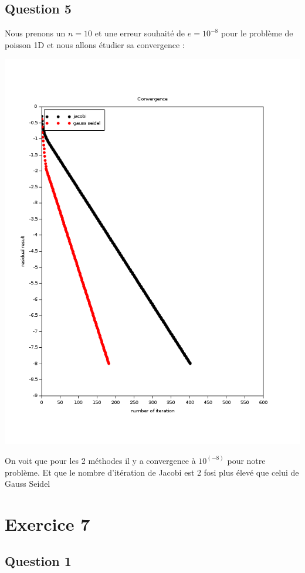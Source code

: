\documentclass[11pt]{article}
\begin{document}
\subsection{Question 5}

Nous prenons un $n = 10$ et une erreur souhaité de $e = 10^{-8}$ pour
le problème de poisson 1D et nous allons étudier sa convergence :

\includegraphics[scale=0.5]{img/convergence.png}

On voit que pour les 2 méthodes il y a convergence à $10^(-8)$ pour
notre problème. Et que le nombre d'itération de Jacobi est 2 fosi plus
élevé que celui de Gauss Seidel

\section{Exercice 7}

\subsection{Question 1}
\end{document}

